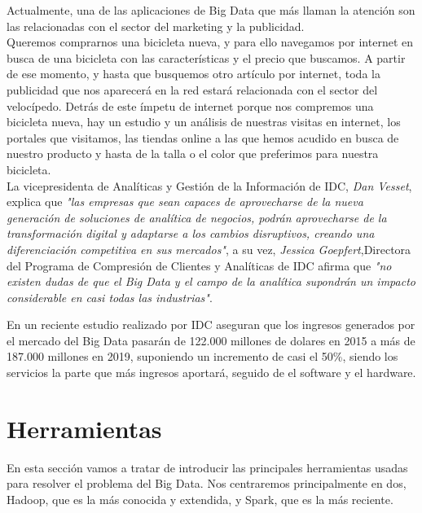 Actualmente, una de las aplicaciones de Big Data que más llaman la atención son las relacionadas con el sector del marketing y la publicidad. \\

Queremos comprarnos una bicicleta nueva, y para ello navegamos por internet  en busca de una  bicicleta con las características y el precio que buscamos. A partir de ese momento, y hasta que busquemos otro artículo por internet, toda la publicidad que nos aparecerá en la red estará relacionada con el sector del velocípedo.
Detrás de este ímpetu de internet porque nos compremos una bicicleta nueva, hay un estudio y un análisis de nuestras visitas en internet, los portales que visitamos, las tiendas online a las que hemos acudido en busca de nuestro producto y hasta de la talla o el color que preferimos para nuestra bicicleta.\\

La vicepresidenta de Analíticas y Gestión de la Información de IDC, \emph{Dan Vesset}, explica que \emph{"las empresas que sean capaces de aprovecharse de la nueva generación de soluciones de analítica de negocios, podrán aprovecharse de la transformación digital y adaptarse a los cambios disruptivos, creando una diferenciación competitiva en sus mercados"}, a su vez, \emph{Jessica Goepfert},Directora del Programa de Compresión de Clientes y Analíticas de IDC afirma que \emph{"no existen dudas de que el Big Data y el campo de la analítica supondrán un impacto considerable en casi todas las industrias"}.\\\cite{ingresos_IDC}

En un reciente estudio realizado por IDC aseguran que los ingresos generados por el mercado del Big Data pasarán de 122.000 millones de dolares en 2015 a más de 187.000 millones en 2019, suponiendo un incremento de casi el 50\%, siendo los servicios la parte que más ingresos aportará, seguido de el software y el hardware. \cite{ingresos_IDC}\\

\section{Herramientas}

En esta sección vamos a tratar de introducir las principales herramientas usadas para resolver el problema del Big Data. Nos centraremos principalmente en dos, Hadoop, que es la más conocida y extendida, y Spark, que es la más reciente.\\

